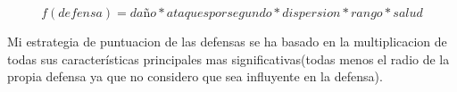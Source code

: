 $$ f(defensa)=daño*ataquesporsegundo*dispersion*rango*salud $$

Mi estrategia de puntuacion de las defensas se ha basado en la multiplicacion de
todas sus características principales mas significativas(todas menos el radio de
la propia defensa ya que no considero que sea influyente en la defensa).

